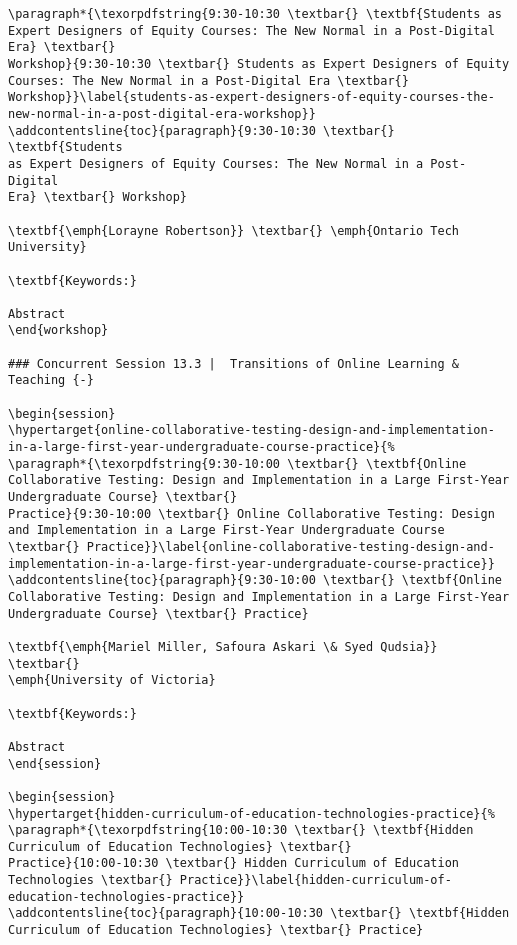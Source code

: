 \documentclass[
]{book}
\begin{document}
\begin{verbatim}
\paragraph*{\texorpdfstring{9:30-10:30 \textbar{} \textbf{Students as
Expert Designers of Equity Courses: The New Normal in a Post-Digital
Era} \textbar{}
Workshop}{9:30-10:30 \textbar{} Students as Expert Designers of Equity Courses: The New Normal in a Post-Digital Era \textbar{} Workshop}}\label{students-as-expert-designers-of-equity-courses-the-new-normal-in-a-post-digital-era-workshop}}
\addcontentsline{toc}{paragraph}{9:30-10:30 \textbar{} \textbf{Students
as Expert Designers of Equity Courses: The New Normal in a Post-Digital
Era} \textbar{} Workshop}

\textbf{\emph{Lorayne Robertson}} \textbar{} \emph{Ontario Tech
University}

\textbf{Keywords:}

Abstract
\end{workshop}

### Concurrent Session 13.3 |  Transitions of Online Learning & Teaching {-}

\begin{session}
\hypertarget{online-collaborative-testing-design-and-implementation-in-a-large-first-year-undergraduate-course-practice}{%
\paragraph*{\texorpdfstring{9:30-10:00 \textbar{} \textbf{Online
Collaborative Testing: Design and Implementation in a Large First-Year
Undergraduate Course} \textbar{}
Practice}{9:30-10:00 \textbar{} Online Collaborative Testing: Design and Implementation in a Large First-Year Undergraduate Course \textbar{} Practice}}\label{online-collaborative-testing-design-and-implementation-in-a-large-first-year-undergraduate-course-practice}}
\addcontentsline{toc}{paragraph}{9:30-10:00 \textbar{} \textbf{Online
Collaborative Testing: Design and Implementation in a Large First-Year
Undergraduate Course} \textbar{} Practice}

\textbf{\emph{Mariel Miller, Safoura Askari \& Syed Qudsia}} \textbar{}
\emph{University of Victoria}

\textbf{Keywords:}

Abstract
\end{session}

\begin{session}
\hypertarget{hidden-curriculum-of-education-technologies-practice}{%
\paragraph*{\texorpdfstring{10:00-10:30 \textbar{} \textbf{Hidden
Curriculum of Education Technologies} \textbar{}
Practice}{10:00-10:30 \textbar{} Hidden Curriculum of Education Technologies \textbar{} Practice}}\label{hidden-curriculum-of-education-technologies-practice}}
\addcontentsline{toc}{paragraph}{10:00-10:30 \textbar{} \textbf{Hidden
Curriculum of Education Technologies} \textbar{} Practice}


\end{verbatim}
\end{document}

